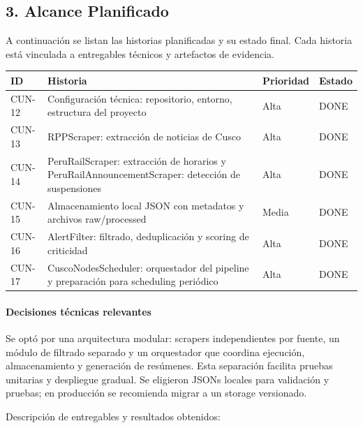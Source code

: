 \documentclass[12pt,a4paper]{article}
\newcommand{\sectiontitle}[1]{\vspace{0.6cm}\noindent{\fontsize{13}{15}\selectfont\textbf{#1}}\par\vspace{0.15cm}\noindent{\fontsize{12}{14}\selectfont}}
\newcommand{\bodytext}[1]{{\fontsize{12}{14}\selectfont #1}\par}
\begin{document}
\subsection*{3. Alcance Planificado}
\bodytext{A continuación se listan las historias planificadas y su estado final. Cada historia está vinculada a entregables técnicos y artefactos de evidencia.}

\begin{longtable}{p{1.5cm} p{8cm} p{2.5cm} p{2.0cm}}
\toprule
\textbf{ID} & \textbf{Historia} & \textbf{Prioridad} & \textbf{Estado} \\
\midrule
CUN-12 & Configuración técnica: repositorio, entorno, estructura del proyecto & Alta & DONE \\
CUN-13 & RPPScraper: extracción de noticias de Cusco & Alta & DONE \\
CUN-14 & PeruRailScraper: extracción de horarios y PeruRailAnnouncementScraper: detección de suspensiones & Alta & DONE \\
CUN-15 & Almacenamiento local JSON con metadatos y archivos raw/processed & Media & DONE \\
CUN-16 & AlertFilter: filtrado, deduplicación y scoring de criticidad & Alta & DONE \\
CUN-17 & CuscoNodesScheduler: orquestador del pipeline y preparación para scheduling periódico & Alta & DONE \\
\bottomrule
\end{longtable}

\paragraph{Decisiones técnicas relevantes}
\bodytext{Se optó por una arquitectura modular: scrapers independientes por fuente, un módulo de filtrado separado y un orquestador que coordina ejecución, almacenamiento y generación de resúmenes. Esta separación facilita pruebas unitarias y despliegue gradual. Se eligieron JSONs locales para validación y pruebas; en producción se recomienda migrar a un storage versionado.}

\sectiontitle{Resultados}
\bodytext{Descripción de entregables y resultados obtenidos:}
\end{document}
